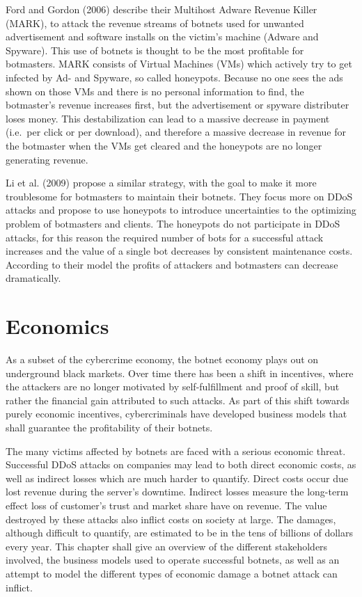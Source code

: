 Ford and Gordon (2006) describe their Multihost Adware Revenue Killer (MARK), to attack the revenue streams of botnets used for unwanted advertisement and software installs on the victim's machine (Adware and Spyware).
This use of botnets is thought to be the most profitable for botmasters.
MARK consists of Virtual Machines (VMs) which actively try to get infected by Ad- and Spyware, so called honeypots.
Because no one sees the ads shown on those VMs and there is no personal information to find, the botmaster's revenue increases first, but the advertisement or spyware distributer loses money.
This destabilization can lead to a massive decrease in payment (i.e.\ per click or per download), and therefore a massive decrease in revenue for the botmaster when the VMs get cleared and the honeypots are no longer generating revenue.\cite{Ford07}

Li et al. (2009) propose a similar strategy, with the goal to make it more troublesome for botmasters to maintain their botnets.
They focus more on DDoS attacks and propose to use honeypots to introduce uncertainties to the optimizing problem of botmasters and clients.
The honeypots do not participate in DDoS attacks, for this reason the required number of bots for a successful attack increases and the value of a single bot decreases by consistent maintenance costs.
According to their model the profits of attackers and botmasters can decrease dramatically.\cite{Li09}

\section{Economics}

As a subset of the cybercrime economy, the botnet economy plays out on underground black markets.
Over time there has been a shift in incentives, where the attackers are no longer motivated by self-fulfillment and proof of skill, but rather the financial gain attributed to such attacks.
As part of this shift towards purely economic incentives, cybercriminals have developed business models that shall guarantee the profitability of their botnets.\cite{Li09}

The many victims affected by botnets are faced with a serious economic threat.
Successful DDoS attacks on companies may lead to both direct economic costs, as well as indirect losses which are much harder to quantify.
Direct costs occur due lost revenue during the server's downtime.
Indirect losses measure the long-term effect loss of customer's trust and market share have on revenue.
The value destroyed by these attacks also inflict costs on society at large.
The damages, although difficult to quantify, are estimated to be in the tens of billions of dollars every year.\cite{Asghari15}
This chapter shall give an overview of the different stakeholders involved, the business models used to operate successful botnets, as well as an attempt to model the different types of economic damage a botnet attack can inflict. 

